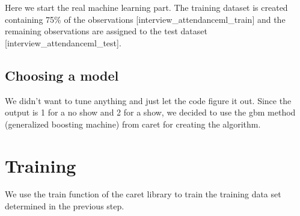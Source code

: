 \documentclass[12pt, krantz2,]{krantz}
\makeatletter
\newenvironment{Shaded}{\begin{snugshade}}{\end{snugshade}}
\newcommand{\CommentTok}[1]{\textcolor[rgb]{0.37,0.37,0.37}{\textit{#1}}}
\newcommand{\DataTypeTok}[1]{\textcolor[rgb]{0.27,0.27,0.27}{#1}}
\newcommand{\DecValTok}[1]{\textcolor[rgb]{0.06,0.06,0.06}{#1}}
\newcommand{\FloatTok}[1]{\textcolor[rgb]{0.06,0.06,0.06}{#1}}
\newcommand{\KeywordTok}[1]{\textcolor[rgb]{0.27,0.27,0.27}{\textbf{#1}}}
\newcommand{\NormalTok}[1]{#1}
\newcommand{\OperatorTok}[1]{\textcolor[rgb]{0.43,0.43,0.43}{\textbf{#1}}}
\newcommand{\OtherTok}[1]{\textcolor[rgb]{0.37,0.37,0.37}{#1}}
\newcommand{\StringTok}[1]{\textcolor[rgb]{0.5,0.5,0.5}{#1}}
\newenvironment{kframe}{%
\medskip{}
\setlength{\fboxsep}{.8em}
 \def\at@end@of@kframe{}%
 \ifinner\ifhmode%
  \def\at@end@of@kframe{\end{minipage}}%
  \begin{minipage}{\columnwidth}%
 \fi\fi%
 \def\FrameCommand##1{\hskip\@totalleftmargin \hskip-\fboxsep
 \colorbox{shadecolor}{##1}\hskip-\fboxsep
     \hskip-\linewidth \hskip-\@totalleftmargin \hskip\columnwidth}%
 \MakeFramed {\advance\hsize-\width
   \@totalleftmargin\z@ \linewidth\hsize
   \@setminipage}}%
 {\par\unskip\endMakeFramed%
 \at@end@of@kframe}
\renewenvironment{Shaded}{\begin{kframe}}{\end{kframe}}
\makeatother
\begin{document}
Here we start the real machine learning part. The training dataset is created containing 75\% of the observations {[}interview\_attendanceml\_train{]} and the remaining observations are assigned to the test dataset {[}interview\_attendanceml\_test{]}.

\begin{Shaded}
\end{Shaded}

\hypertarget{choosing-a-model}{%
\section{Choosing a model}\label{choosing-a-model}}

We didn't want to tune anything and just let the code figure it out. Since the output is 1 for a no show and 2 for a show, we decided to use the gbm method (generalized boosting machine) from caret for creating the algorithm.

\hypertarget{training}{%
\chapter{Training}\label{training}}

We use the train function of the caret library to train the training data set determined in the previous step.
\end{document}
